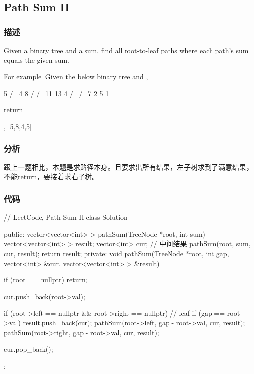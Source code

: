 \subsection{Path Sum II}
\label{sec:path-sum-ii}


\subsubsection{描述}
Given a binary tree and a sum, find all root-to-leaf paths where each path's sum equals the given sum.

For example:
Given the below binary tree and ,
\begin{Code}
          5
         / \
        4   8
       /   / \
      11  13  4
     /  \    / \
    7    2  5   1
\end{Code}
return
\begin{Code}
[
   [5,4,11,2],
   [5,8,4,5]
]
\end{Code}


\subsubsection{分析}
跟上一题相比，本题是求路径本身。且要求出所有结果，左子树求到了满意结果，不能return，要接着求右子树。

\subsubsection{代码}

\begin{Code}
// LeetCode, Path Sum II
class Solution {
public:
    vector<vector<int> > pathSum(TreeNode *root, int sum) {
        vector<vector<int> > result;
        vector<int> cur; // 中间结果
        pathSum(root, sum, cur, result);
        return result;
    }
private:
    void pathSum(TreeNode *root, int gap, vector<int> &cur,
            vector<vector<int> > &result) {
        if (root == nullptr) return;

        cur.push_back(root->val);

        if (root->left == nullptr && root->right == nullptr) { // leaf
            if (gap == root->val) {
                result.push_back(cur);
            }
        }
        pathSum(root->left, gap - root->val, cur, result);
        pathSum(root->right, gap - root->val, cur, result);

        cur.pop_back();
    }
};
\end{Code}


